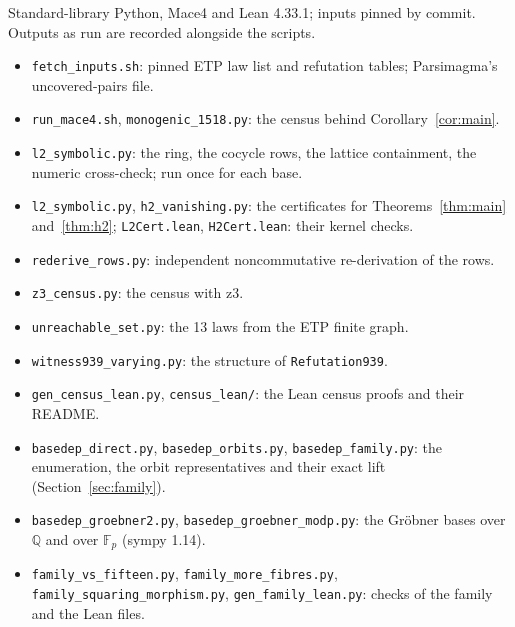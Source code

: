 \documentclass[11pt]{article}
\theoremstyle{remark}\newtheorem*{remark}{Remark}
\newcommand{\Q}{\mathbb{Q}}
\newcommand{\F}{\mathbb{F}}
\begin{document}
Standard-library Python, Mace4 and Lean 4.33.1; inputs pinned by commit. Outputs as run are recorded alongside the scripts.
\begin{itemize}\setlength{\itemsep}{0pt}
\item \texttt{fetch\_inputs.sh}: pinned ETP law list and refutation tables; Parsimagma's uncovered-pairs file.
\item \texttt{run\_mace4.sh}, \texttt{monogenic\_1518.py}: the census behind Corollary~\ref{cor:main}.
\item \texttt{l2\_symbolic.py}: the ring, the cocycle rows, the lattice containment, the numeric cross-check; run once for each base.
\item \texttt{l2\_symbolic.py}, \texttt{h2\_vanishing.py}: the certificates for Theorems~\ref{thm:main} and~\ref{thm:h2}; \texttt{L2Cert.lean}, \texttt{H2Cert.lean}: their kernel checks.
\item \texttt{rederive\_rows.py}: independent noncommutative re-derivation of the rows.
\item \texttt{z3\_census.py}: the census with z3.
\item \texttt{unreachable\_set.py}: the 13 laws from the ETP finite graph.
\item \texttt{witness939\_varying.py}: the structure of \texttt{Refutation939}.
\item \texttt{gen\_census\_lean.py}, \texttt{census\_lean/}: the Lean census proofs and their README.
\item \texttt{basedep\_direct.py}, \texttt{basedep\_orbits.py}, \texttt{basedep\_family.py}: the enumeration, the orbit representatives and their exact lift (Section~\ref{sec:family}).
\item \texttt{basedep\_groebner2.py}, \texttt{basedep\_groebner\_modp.py}: the Gr\"obner bases over $\Q$ and over $\F_p$ (sympy 1.14).
\raggedright\item \texttt{family\_vs\_fifteen.py}, \texttt{family\_more\_fibres.py}, \texttt{family\_squaring\_morphism.py}, \texttt{gen\_family\_lean.py}: checks of the family and the Lean files.
\end{itemize}
\end{document}
